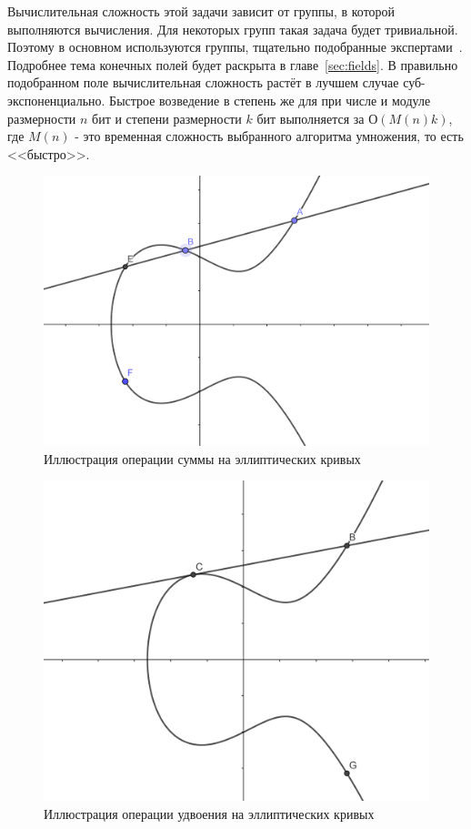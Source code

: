 \documentclass[times,specification,annotation]{itmo-student-thesis}
\begin{document}
Вычислительная сложность этой задачи зависит от группы, в которой выполняются вычисления.
Для некоторых групп такая задача будет тривиальной.
Поэтому в основном используются группы, тщательно подобранные экспертами~\cite{rfc2412}.
Подробнее тема конечных полей будет раскрыта в главе~\ref{sec:fields}.
В правильно подобранном поле вычислительная сложность растёт в лучшем случае суб-экспоненциально.
Быстрое возведение в степень же для при числе и модуле размерности $n$ бит и степени размерности $k$ бит
выполняется за $О(M(n)k)$, где $M(n)$ - это временная сложность выбранного алгоритма умножения, то есть <<быстро>>.

\begin{figure}[!b]
\caption{Иллюстрация операции суммы на эллиптических кривых}\label{fig:ec_sum}
\includegraphics[width=15cm]{graphics/ec_summation.png}
\end{figure}
\begin{figure}[!h]
\caption{Иллюстрация операции удвоения на эллиптических кривых}\label{fig:ec_doub}
\includegraphics[width=15cm]{graphics/ec_doubling.png}
\end{figure}
\end{document}
